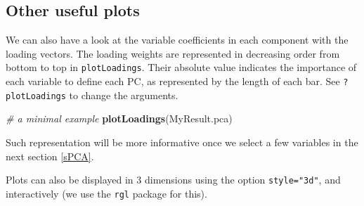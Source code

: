 \documentclass[]{book}
\newenvironment{Shaded}{\begin{snugshade}}{\end{snugshade}}
\newcommand{\KeywordTok}[1]{\textcolor[rgb]{0.13,0.29,0.53}{\textbf{#1}}}
\newcommand{\DataTypeTok}[1]{\textcolor[rgb]{0.13,0.29,0.53}{#1}}
\newcommand{\DecValTok}[1]{\textcolor[rgb]{0.00,0.00,0.81}{#1}}
\newcommand{\FloatTok}[1]{\textcolor[rgb]{0.00,0.00,0.81}{#1}}
\newcommand{\StringTok}[1]{\textcolor[rgb]{0.31,0.60,0.02}{#1}}
\newcommand{\CommentTok}[1]{\textcolor[rgb]{0.56,0.35,0.01}{\textit{#1}}}
\newcommand{\OtherTok}[1]{\textcolor[rgb]{0.56,0.35,0.01}{#1}}
\newcommand{\OperatorTok}[1]{\textcolor[rgb]{0.81,0.36,0.00}{\textbf{#1}}}
\newcommand{\NormalTok}[1]{#1}
\theoremstyle{definition}
\theoremstyle{definition}
\theoremstyle{definition}
\theoremstyle{remark}
\begin{document}
\subsection{Other useful plots}\label{other-useful-plots}

We can also have a look at the variable coefficients in each component
with the loading vectors. The loading weights are represented in
decreasing order from bottom to top in \texttt{plotLoadings}. Their
absolute value indicates the importance of each variable to define each
PC, as represented by the length of each bar. See \texttt{?plotLoadings}
to change the arguments.

\begin{Shaded}
\begin{Highlighting}[]
\CommentTok{# a minimal example}
\KeywordTok{plotLoadings}\NormalTok{(MyResult.pca)}
\end{Highlighting}
\end{Shaded}

\begin{Shaded}
\end{Shaded}

Such representation will be more informative once we select a few
variables in the next section \ref{sPCA}.

Plots can also be displayed in 3 dimensions using the option
\texttt{style="3d"}, and interactively (we use the \texttt{rgl} package
for this).

\begin{Shaded}
\end{Shaded}
\end{document}
